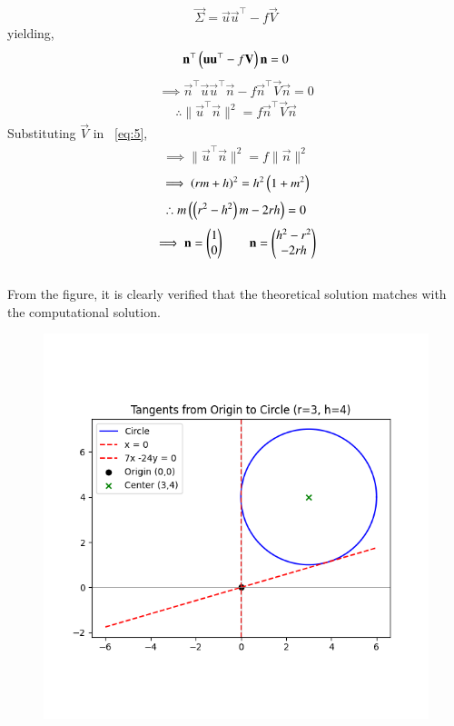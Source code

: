 \documentclass[journal]{IEEEtran}
\begin{document}
\begin{align}
    \vec{\Sigma}=\vec{u}\vec{u}^{\top}-f\vec{V}
\end{align}
yielding,
\begin{align}
    \mathbf{n}^{\top}\left(\mathbf{u}\mathbf{u}^{\top}-f\mathbf{V}\right)\mathbf{n}=0
\end{align}
\newpage
\vspace*{0.25cm}
\begin{align}
    \implies \vec{n}^{\top}\vec{u}\vec{u}^{\top}\vec{n}-f\vec{n}^{\top}\vec{V}\vec{n}=0 
\end{align}
\begin{align}
    \therefore \|\vec{u}^{\top}\vec{n}\|^2=f\vec{n}^{\top}\vec{V}\vec{n} \label{eq:5}
\end{align}
Substituting $\vec{V}$ in ~\eqref{eq:5},
\begin{align}
    \implies \|\vec{u}^{\top}\vec{n}\|^2=f\|\vec{n}\|^2
\end{align}
\begin{align}
    \implies \left(rm+h\right)^2=h^2\left(1+m^2\right)
\end{align}
\begin{align}
    \therefore m\left(\left(r^2-h^2\right)m-2rh\right)=0
\end{align}
\begin{align}
    \implies \mathbf{n}=\begin{pmatrix}1\\0\end{pmatrix} \qquad \mathbf{n}=\begin{pmatrix}h^2-r^2\\-2rh\end{pmatrix}
\end{align}
\\
From the figure, it is clearly verified that the theoretical solution matches with the computational solution.\\

\begin{figure}[H]
    \centering
    \includegraphics[width=0.6\columnwidth]{figs/Figure_1.png}
    \label{fig:1}
\end{figure}
\end{document}
